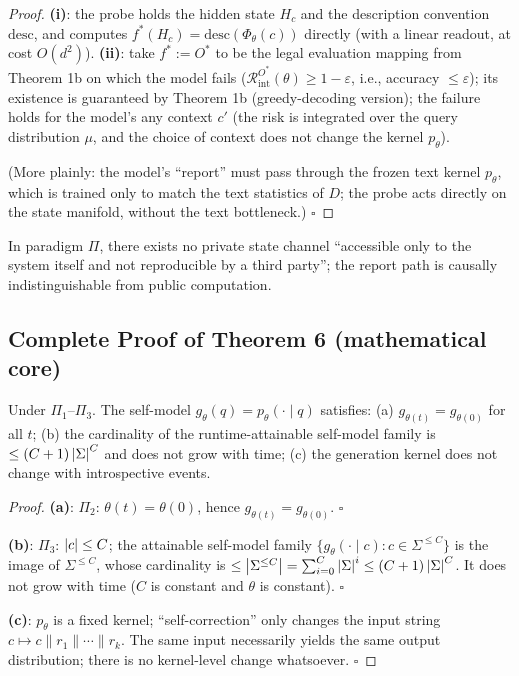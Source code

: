 \begin{proof}
\textbf{(i)}: the probe holds the hidden state $H_c$ and the description convention
$\mathrm{desc}$, and computes $f^{*}(H_c) = \mathrm{desc}(\Phi_\theta(c))$ directly (with a
linear readout, at cost $O(d^2)$). \textbf{(ii)}: take $f^{*} := O^{*}$ to be the legal
evaluation mapping from Theorem 1b on which the model fails
($\mathcal{R}_{\mathrm{int}}^{O^{*}}(\theta) \ge 1-\varepsilon$, i.e., accuracy
$\le \varepsilon$); its existence is guaranteed by Theorem 1b (greedy-decoding version);
the failure holds for the model's any context $c'$ (the risk is integrated over the query
distribution $\mu$, and the choice of context does not change the kernel $p_\theta$).

(More plainly: the model's ``report'' must pass through the frozen text kernel $p_\theta$, which
is trained only to match the text statistics of $D$; the probe acts directly on the state
manifold, without the text bottleneck.) $\square$
\end{proof}

\begin{restatecor}
In paradigm $\Pi$, there exists no private state channel ``accessible only to the system
itself and not reproducible by a third party''; the report path is causally indistinguishable
from public computation.
\end{restatecor}

\subsection{Complete Proof of Theorem 6 (mathematical core)}

\begin{restate}[Theorems 6a--6c]
Under $\Pi_1$--$\Pi_3$. The self-model $g_\theta(q) = p_\theta(\cdot \mid q)$ satisfies:
(a) $g_{\theta(t)} = g_{\theta(0)}$ for all $t$;
(b) the cardinality of the runtime-attainable self-model family is $\le (C+1)\left\lvert \Sigma \right\rvert^{C}$
and does not grow with time;
(c) the generation kernel does not change with introspective events.
\end{restate}

\begin{proof}
\textbf{(a)}: $\Pi_2$: $\theta(t) = \theta(0)$, hence $g_{\theta(t)} = g_{\theta(0)}$.
$\square$

\textbf{(b)}: $\Pi_3$: $\left\lvert c \right\rvert \le C$; the attainable self-model family
$\{ g_\theta(\cdot \mid c) : c \in \Sigma^{\le C} \}$ is the image of $\Sigma^{\le C}$, whose
cardinality is $\le \left\lvert \Sigma^{\le C} \right\rvert = \sum_{i=0}^{C}\left\lvert \Sigma \right\rvert^i \le
(C+1)\left\lvert \Sigma \right\rvert^{C}$. It does not grow with time ($C$ is constant and $\theta$ is
constant). $\square$

\textbf{(c)}: $p_\theta$ is a fixed kernel; ``self-correction'' only changes the input string
$c \mapsto c \| r_1 \| \cdots \| r_k$. The same input necessarily yields the same output
distribution; there is no kernel-level change whatsoever. $\square$
\end{proof}


